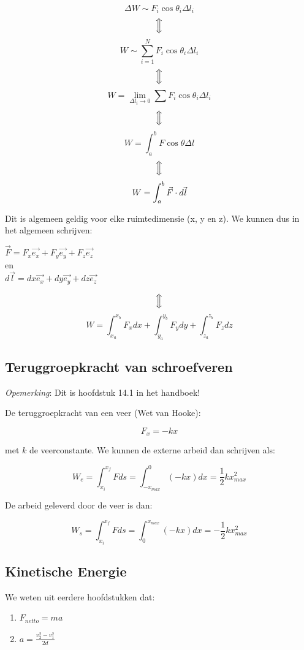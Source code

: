 \documentclass[12pt,a4paper]{article}
\newcommand{\Luda}{\Big\Updownarrow}
\begin{document}
    $$\Delta W \sim F_{i}\cos{\theta_{i}}\Delta l_{i}$$
    $$\Luda$$
    $$W \sim \sum_{i = 1}^{N} F_{i}\cos{\theta_{i}}\Delta l_{i}$$
    $$\Luda$$
    $$W = \lim_{\Delta l_{i} \to 0}\sum F_{i}\cos{\theta_{i}}\Delta l_{i}$$
    $$\Luda$$
    $$W = \int_{a}^{b} F\cos{\theta}\Delta l $$ 
    $$\Luda$$
    $$W = \int_{a}^{b} \vec{F} \cdot d\vec{\emph{l}} $$
    
    Dit is algemeen geldig voor elke ruimtedimensie (x, y en z). We kunnen dus in het algemeen schrijven:
    
    \begin{center}
    	$\vec{F} = F_{x}\vec{e_{x}} + F_{y}\vec{e_{y}} + F_{z}\vec{e_{z}}$\\
     	en\\
   	$d\vec{l} = dx\vec{e_{x}} + dy\vec{e_{y}} + dz\vec{e_{z}} $\\
   \end{center}
    $$\Luda$$	
    $$W = \int_{x_{a}}^{x_{b}} F_{x}dx + \int_{y_{a}}^{y_{b}} F_{y}dy + \int_{z_{a}}^{z_{b}} F_{z}dz$$
    
    \subsection{Teruggroepkracht van schroefveren}
    \emph{Opemerking}: Dit is hoofdstuk 14.1 in het handboek!
   
    De teruggroepkracht van een veer (Wet van Hooke): 
    
    $$ F_{x} = -kx $$ 
    
    met $k$ de veerconstante. We kunnen de externe arbeid dan schrijven als:
    
    $$W_{e} = \int_{x_{i}}^{x_{f}} Fds = \int_{-x_{max}}^{0}(-kx)dx = \frac{1}{2}kx^{2}_{max}$$
    
    De arbeid geleverd door de veer is dan:
    
    $$W_{s} = \int_{x_{i}}^{x_{f}} Fds = \int_{0}^{x_{max}}(-kx)dx = -\frac{1}{2}kx^{2}_{max}$$
    
    \subsection{Kinetische Energie}
    We weten uit eerdere hoofdstukken dat:
    
    \begin{enumerate}
    	\item $F_{netto} = ma$
    	\item $a = \frac{v_{2}^{2} - v_{1}^{2}}{2d}$
    \end{enumerate}
    
\end{document}
